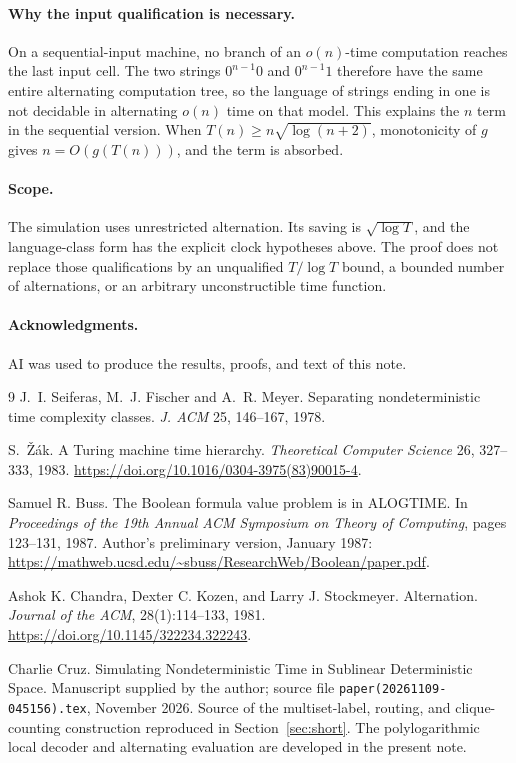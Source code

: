 \documentclass[11pt]{article}
\theoremstyle{definition}
\theoremstyle{remark}
\begin{document}
\paragraph{Why the input qualification is necessary.}
On a sequential-input machine, no branch of an $o(n)$-time computation reaches the last input cell. The two strings $0^{n-1}0$ and $0^{n-1}1$ therefore have the same entire alternating computation tree, so the language of strings ending in one is not decidable in alternating $o(n)$ time on that model. This explains the $n$ term in the sequential version. When $T(n)\ge n\sqrt{\log(n+2)}$, monotonicity of $g$ gives $n=O(g(T(n)))$, and the term is absorbed.

\paragraph{Scope.}
The simulation uses unrestricted alternation. Its saving is $\sqrt{\log T}$, and the language-class form has the explicit clock hypotheses above. The proof does not replace those qualifications by an unqualified $T/\log T$ bound, a bounded number of alternations, or an arbitrary unconstructible time function.

\paragraph{Acknowledgments.}
AI was used to produce the results, proofs, and text of this note.

\begin{thebibliography}{9}
J.~I. Seiferas, M.~J. Fischer and A.~R. Meyer.
Separating nondeterministic time complexity classes.
\emph{J. ACM} 25, 146--167, 1978.

S.~\v{Z}\'ak. A Turing machine time hierarchy.
\emph{Theoretical Computer Science} 26, 327--333, 1983.
\url{https://doi.org/10.1016/0304-3975(83)90015-4}.

Samuel R. Buss.
\newblock The Boolean formula value problem is in {ALOGTIME}.
\newblock In \emph{Proceedings of the 19th Annual ACM Symposium on Theory of Computing}, pages 123--131, 1987.
\newblock Author's preliminary version, January 1987: \url{https://mathweb.ucsd.edu/~sbuss/ResearchWeb/Boolean/paper.pdf}.

Ashok K. Chandra, Dexter C. Kozen, and Larry J. Stockmeyer.
\newblock Alternation.
\newblock \emph{Journal of the ACM}, 28(1):114--133, 1981.
\newblock \url{https://doi.org/10.1145/322234.322243}.

Charlie Cruz.
\newblock Simulating Nondeterministic Time in Sublinear Deterministic Space.
\newblock Manuscript supplied by the author; source file
\texttt{paper(20261109-045156).tex}, November 2026.
\newblock Source of the multiset-label, routing, and clique-counting construction reproduced in Section~\ref{sec:short}. The polylogarithmic local decoder and alternating evaluation are developed in the present note.
\end{thebibliography}
\end{document}
